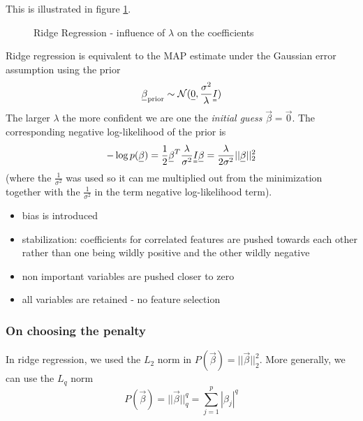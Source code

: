 This is illustrated in figure \ref{fig:ridge_reg_lambda}.

\begin{figure}[!htb]
    \centering
    
    \caption{Ridge Regression - influence of $\lambda$ on the coefficients}
    \label{fig:ridge_reg_lambda}
\end{figure}

Ridge regression is equivalent to the MAP estimate under the Gaussian error assumption using the prior
\begin{equation}
    \vec{\beta}_\text{prior} \sim \mathcal{N}(\vec{0}, \frac{\sigma^2}{\lambda} \mat{I})
\end{equation}
The larger $\lambda$ the more confident we are
one the \textit{initial guess} $\vec{\beta} = \vec{0}$. The corresponding negative log-likelihood of the prior is
\begin{equation}
    -\log p(\vec{\beta}) = \frac{1}{2} \vec{\beta}^T \frac{\lambda}{\sigma^2} \mat{I} \vec{\beta} = \frac{\lambda}{2 \sigma^2} || \vec{\beta} ||_2^2
\end{equation}
(where the $\frac{1}{\sigma^2}$ was used so it can me multiplied out from the minimization
together with the $\frac{1}{\sigma^2}$ in the term negative log-likelihood term).

\begin{itemize}
    \item bias is introduced
    \item \textcolor{green1}{stabilization:} coefficients for correlated features are pushed towards each other rather than
    one being wildly positive and the other wildly negative
    \item \textcolor{green1}{non important variables are pushed closer to zero}
    \item \textcolor{red1}{all variables are retained - no feature selection}
\end{itemize}

\subsubsection{On choosing the penalty}
In ridge regression, we used the $L_2$ norm in $P(\vec{\beta}) = || \vec{\beta} ||_2^2$.
More generally, we can use the $L_q$ norm
\begin{equation}
    P(\vec{\beta}) = || \vec{\beta} ||_q^q = \sum_{j=1}^p |\beta_j|^q
\end{equation}

